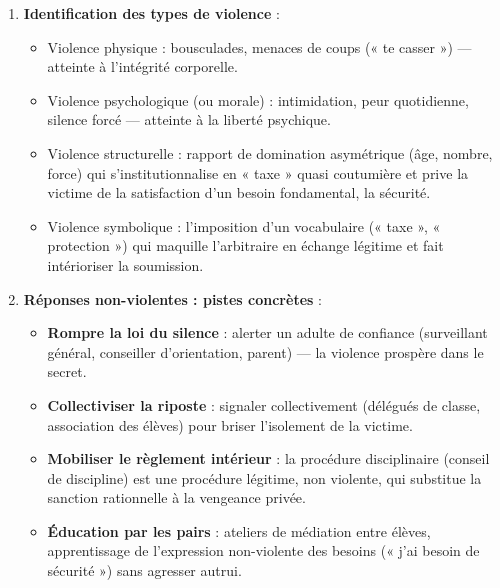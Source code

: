 \documentclass[11pt]{article}
\newcommand{\cle}[1]{{\popxbold\color{popdark}#1}}
\newcounter{popsec}
\newcounter{popsub}
\newcommand{\courssub}[1]{%
  \stepcounter{popsub}%
  \par\vspace{9pt}\noindent{\popxbold\fontsize{11.5}{13}\selectfont\color{popink}{\color{poporange}\thepopsec.\thepopsub}\hspace{6pt}#1}\par\nopagebreak\vspace{4pt}
}
\begin{document}
\courssub{Analyse guidée}

\begin{enumerate}
\item \textbf{Identification des types de violence} :
\begin{itemize}
\item \cle{Violence physique} : bousculades, menaces de coups (« te casser ») — atteinte à l'intégrité corporelle.
\item \cle{Violence psychologique} (ou morale) : intimidation, peur quotidienne, silence forcé — atteinte à la liberté psychique.
\item \cle{Violence structurelle} : rapport de domination asymétrique (âge, nombre, force) qui s'institutionnalise en « taxe » quasi coutumière et prive la victime de la satisfaction d'un besoin fondamental, la sécurité.
\item \cle{Violence symbolique} : l'imposition d'un vocabulaire (« taxe », « protection ») qui maquille l'arbitraire en échange légitime et fait intérioriser la soumission.
\end{itemize}

\item \textbf{Réponses non-violentes : pistes concrètes} :
\begin{itemize}
\item \textbf{Rompre la loi du silence} : alerter un adulte de confiance (surveillant général, conseiller d'orientation, parent) — la violence prospère dans le secret.
\item \textbf{Collectiviser la riposte} : signaler collectivement (délégués de classe, association des élèves) pour briser l'isolement de la victime.
\item \textbf{Mobiliser le règlement intérieur} : la procédure disciplinaire (conseil de discipline) est une \cle{procédure légitime}, non violente, qui substitue la sanction rationnelle à la vengeance privée.
\item \textbf{Éducation par les pairs} : ateliers de médiation entre élèves, apprentissage de l'expression non-violente des besoins (« j'ai besoin de sécurité ») sans agresser autrui.
\end{itemize}
\end{enumerate}
\end{document}
